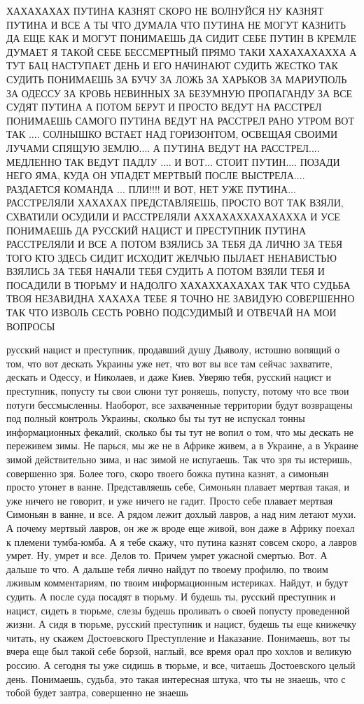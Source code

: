 ХАХАХАХАХ ПУТИНА КАЗНЯТ СКОРО НЕ ВОЛНУЙСЯ НУ КАЗНЯТ ПУТИНА И ВСЕ А ТЫ ЧТО
ДУМАЛА ЧТО ПУТИНА НЕ МОГУТ КАЗНИТЬ ДА ЕЩЕ КАК И МОГУТ ПОНИМАЕШЬ ДА СИДИТ СЕБЕ
ПУТИН В КРЕМЛЕ ДУМАЕТ Я ТАКОЙ СЕБЕ БЕССМЕРТНЫЙ ПРЯМО ТАКИ ХАХАХАХАХХА А ТУТ БАЦ
НАСТУПАЕТ ДЕНЬ И ЕГО НАЧИНАЮТ СУДИТЬ ЖЕСТКО ТАК СУДИТЬ ПОНИМАЕШЬ ЗА БУЧУ ЗА
ЛОЖЬ ЗА ХАРЬКОВ ЗА МАРИУПОЛЬ ЗА ОДЕССУ ЗА КРОВЬ НЕВИННЫХ ЗА БЕЗУМНУЮ ПРОПАГАНДУ
ЗА ВСЕ СУДЯТ ПУТИНА А ПОТОМ БЕРУТ И ПРОСТО ВЕДУТ НА РАССТРЕЛ ПОНИМАЕШЬ САМОГО
ПУТИНА ВЕДУТ НА РАССТРЕЛ РАНО УТРОМ ВОТ ТАК .... СОЛНЫШКО ВСТАЕТ НАД
ГОРИЗОНТОМ, ОСВЕЩАЯ СВОИМИ ЛУЧАМИ СПЯЩУЮ ЗЕМЛЮ.... А ПУТИНА ВЕДУТ НА
РАССТРЕЛ.... МЕДЛЕННО ТАК ВЕДУТ ПАДЛУ .... И ВОТ... СТОИТ ПУТИН.... ПОЗАДИ НЕГО
ЯМА, КУДА ОН УПАДЕТ МЕРТВЫЙ ПОСЛЕ ВЫСТРЕЛА.... РАЗДАЕТСЯ КОМАНДА ... ПЛИ!!!! И
ВОТ, НЕТ УЖЕ ПУТИНА... РАССТРЕЛЯЛИ ХАХАХАХ ПРЕДСТАВЛЯЕШЬ, ПРОСТО ВОТ ТАК ВЗЯЛИ,
СХВАТИЛИ ОСУДИЛИ И РАССТРЕЛЯЛИ АХХАХАХХАХАХАХХА И УСЕ ПОНИМАЕШЬ ДА
РУССКИЙ НАЦИСТ И ПРЕСТУПНИК ПУТИНА РАССТРЕЛЯЛИ И ВСЕ А ПОТОМ ВЗЯЛИСЬ ЗА ТЕБЯ
ДА ЛИЧНО ЗА ТЕБЯ ТОГО КТО ЗДЕСЬ СИДИТ ИСХОДИТ ЖЕЛЧЬЮ ПЫЛАЕТ НЕНАВИСТЬЮ
ВЗЯЛИСЬ ЗА ТЕБЯ НАЧАЛИ ТЕБЯ СУДИТЬ А ПОТОМ ВЗЯЛИ ТЕБЯ И ПОСАДИЛИ В ТЮРЬМУ
И НАДОЛГО ХАХАХХАХАХАХ ТАК ЧТО СУДЬБА ТВОЯ НЕЗАВИДНА ХАХАХА ТЕБЕ Я ТОЧНО НЕ ЗАВИДУЮ СОВЕРШЕННО
ТАК ЧТО ИЗВОЛЬ СЕСТЬ РОВНО ПОДСУДИМЫЙ И ОТВЕЧАЙ НА МОИ ВОПРОСЫ

русский нацист и преступник, продавший душу Дьяволу, истошно вопящий о том, 
что вот дескать Украины уже нет, что вот вы все там сейчас захватите,
дескать и Одессу, и Николаев, и даже Киев. Уверяю тебя, русский нацист и преступник,
попусту ты свои слюни тут роняешь, попусту, потому что все твои потуги бессмысленны.
Наоборот, все захваченные территории будут возвращены под полный контроль Украины,
сколько бы ты тут не испускал тонны информационных фекалий, сколько бы ты тут не вопил о том,
что мы дескать не переживем зимы. Не парься, мы же не в Африке живем, а в Украине,
а в Украине зимой действительно зима, и нас зимой не испугаешь. Так что зря ты истеришь,
совершенно зря. Более того, скоро твоего божка путина казнят, а симоньян просто утонет в ванне.
Представляешь себе, Симоньян плавает мертвая такая, и уже ничего не говорит,
и уже ничего не гадит. Просто себе плавает мертвая Симоньян в ванне, и все. А рядом лежит
дохлый лавров, а над ним летают мухи. А почему мертвый лавров, он же ж вроде
еще живой, вон даже в Африку поехал к племени тумба-юмба. А я тебе скажу, что путина казнят совсем скоро,
а лавров умрет. Ну, умрет и все. Делов то. Причем умрет ужасной смертью. Вот. А дальше то что.
А дальше тебя лично найдут по твоему профилю, по твоим лживым комментариям, по твоим
информационным истериках. Найдут, и будут судить. А после суда посадят в тюрьму. И будешь ты,
русский преступник и нацист, сидеть в тюрьме, слезы будешь проливать о своей попусту проведенной жизни.
А сидя в тюрьме, русский преступник и нацист, будешь ты еще книжечку читать, ну скажем Достоевского
Преступление и Наказание. Понимаешь, вот ты вчера еще был такой себе борзой, наглый, все время орал
про хохлов и великую россию. А сегодня ты уже сидишь в тюрьме, и все, читаешь Достоевского целый день.
Понимаешь, судьба, это такая интересная штука, что ты не знаешь, что с тобой будет завтра, совершенно 
не знаешь

